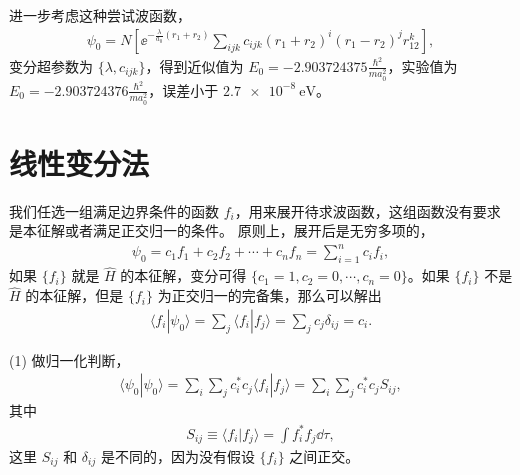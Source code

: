 进一步考虑这种尝试波函数，
\begin{align}
    \psi_0 = N \left[ 
        \ee^{-\frac{\lambda}{a_0}(r_1 + r_2)}
    \sum_{ijk} c_{ijk} (r_1 + r_2)^i (r_1 - r_2)^j r_{12}^k
    \right],
\end{align}
变分超参数为 $\{\lambda, c_{ijk}\}$，得到近似值为 $E_0 = \num{-2.903724375} \frac{\hbar^2}{ma_0^2}$，实验值为 $E_0 = \num{-2.903724376} \frac{\hbar^2}{ma_0^2}$，误差小于 $\SI{2.7e-8}{\electronvolt}$。

\section{线性变分法}

我们任选一组满足边界条件的函数 $f_i$，用来展开待求波函数，这组函数没有要求是本征解或者满足正交归一的条件。
原则上，展开后是无穷多项的，
\begin{align}
    \psi_0 = c_1 f_1 + c_2 f_2 + \cdots + c_n f_n = \sum_{i=1}^n c_i f_i,
\end{align}
如果 $\{f_i\}$ 就是 $\hat H$ 的本征解，变分可得 $\{c_1 = 1, c_2=0, \cdots, c_n =0\}$。如果 $\{f_i\}$ 不是 $\hat H$ 的本征解，但是 $\{f_i\}$ 为正交归一的完备集，那么可以解出
\begin{align}
    \langle f_i | \psi_0 \rangle = \sum_j \langle f_i | f_j \rangle = \sum_j c_j \delta_{ij} = c_i.
\end{align}

(1) 做归一化判断，
\begin{align}
    \langle \psi_0 | \psi_0 \rangle = \sum_{i}\sum_j c_i^* c_j \langle f_i | f_j \rangle = \sum_i \sum_j c_i^* c_j S_{ij}, 
\end{align}
其中
\begin{align}
    S_{ij} \equiv \langle f_i | f_j \rangle = \int f_i^* f_j \dd\tau, 
\end{align}
这里 $S_{ij}$ 和 $\delta_{ij}$ 是不同的，因为没有假设 $\{f_i\}$ 之间正交。

